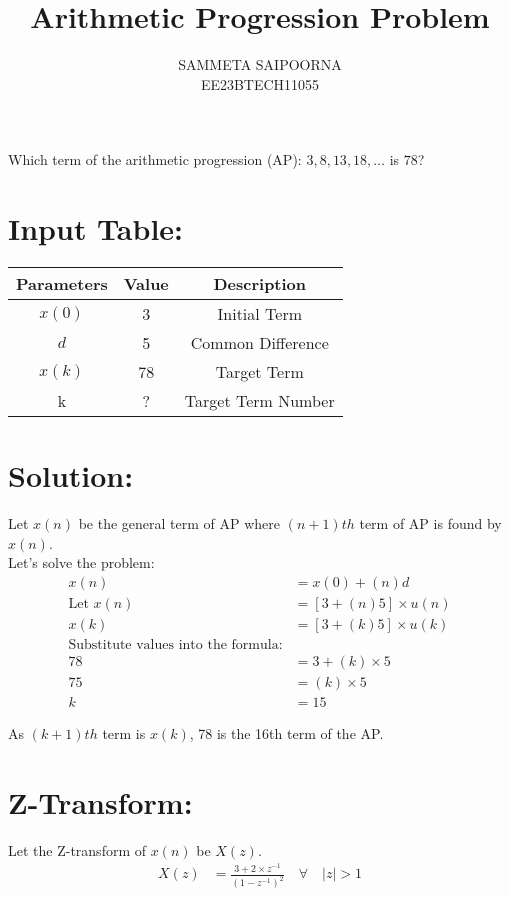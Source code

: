 \documentclass[12pt]{article}
\title{Arithmetic Progression Problem}
\author{SAMMETA SAIPOORNA \\
        EE23BTECH11055}
\date{}
\newcommand{\initialterm}{3}
\newcommand{\commondifference}{5}
\newcommand{\targetterm}{78}
\begin{document}
\maketitle

Which term of the arithmetic progression (AP): \(3, 8, 13, 18, \ldots\) is \(78\)?

\section{Input Table:}
\begin{center}
\begin{tabular}{|c|c|c|}
  \hline
   Parameters & Value & Description \\
  \hline
   \(x(0)\) & 3 & Initial Term \\
  \hline
   \(d\) & 5 & Common Difference \\
  \hline
   \(x(k)\) & 78 & Target Term \\
  \hline
  k & ? & Target Term Number\\
  \hline
\end{tabular}
\end{center}

\section{Solution:}
Let $x(n)$ be the general term of AP where $(n+1)th$ term of AP is found by $x(n)$.\\ 
Let's solve the problem:
\begin{align}
x(n) &= x(0) + (n)d \\
\text{Let } x(n) &= [\initialterm + (n)\commondifference] \times u(n) \\
x(k) &= [\initialterm + (k)\commondifference] \times u(k)\\
\text{Substitute values into the formula:} \\
\targetterm &= \initialterm + (k) \times \commondifference \\
75 &= (k) \times 5 \\
k &= 15
\end{align}

As $(k+1)th$ term is $x(k)$, 78 is the 16th term of the AP.\\ 


\section{Z-Transform:}
Let the Z-transform of \(x(n)\) be \(X(z)\).
\begin{align}
X(z) &= \frac{3 +2\times z^{-1}}{(1 - z^{-1})^2} \quad \forall \quad |z| > 1
\end{align}
\end{document}

